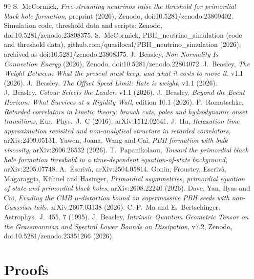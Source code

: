 \documentclass[11pt]{article}
\begin{document}
\begin{thebibliography}{99}
 S.~McCormick, \emph{Free-streaming neutrinos raise the threshold for primordial black hole formation}, preprint (2026), Zenodo, doi:10.5281/zenodo.23809402. Simulation code, threshold data and scripts: Zenodo, doi:10.5281/zenodo.23808375.
 S.~McCormick, PBH\_neutrino\_simulation (code and threshold data), github.com/quasilocal/PBH\_neutrino\_simulation (2026); archived as doi:10.5281/zenodo.23808375.
 J.~Beasley, \emph{Non-Normality Is Connection Energy} (2026), Zenodo, doi:10.5281/zenodo.22804072.
 J.~Beasley, \emph{The Weight Between: What the present must keep, and what it costs to move it}, v1.1 (2026).
 J.~Beasley, \emph{The Offset Speed Limit: Rate is weight}, v1.1 (2026).
 J.~Beasley, \emph{Colour Selects the Leader}, v1.1 (2026).
 J.~Beasley, \emph{Beyond the Event Horizon: What Survives at a Rigidity Wall}, edition 10.1 (2026).
 P.~Romatschke, \emph{Retarded correlators in kinetic theory: branch cuts, poles and hydrodynamic onset transitions}, Eur.\ Phys.\ J.\ C (2016), arXiv:1512.02641.
 J.~Hu, \emph{Relaxation time approximation revisited and non-analytical structure in retarded correlators}, arXiv:2409.05131.
 Yuwen, Joana, Wang and Cai, \emph{PBH formation with bulk viscosity}, arXiv:2606.26532 (2026).
 T.~Papanikolaou, \emph{Toward the primordial black hole formation threshold in a time-dependent equation-of-state background}, arXiv:2205.07748.
 A.~Escriv\`a, arXiv:2504.05814.
 Gonin, Froustey, Escriv\`a, Magaraggia, K\"uhnel and Hasinger, \emph{Primordial asymmetries, primordial equation of state and primordial black holes}, arXiv:2608.22240 (2026).
 Dave, Yan, Ilyas and Cai, \emph{Evading the CMB $\mu$-distortion bound on supermassive PBH seeds with non-Gaussian tails}, arXiv:2607.03138 (2026).
 C.-P.~Ma and E.~Bertschinger, Astrophys.\ J.\ 455, 7 (1995).
 J.~Beasley, \emph{Intrinsic Quantum Geometric Tensor on the Grassmannian and Spectral Lower Bounds on Dissipation}, v7.2, Zenodo, doi:10.5281/zenodo.23351266 (2026).
\end{thebibliography}

\appendix
\section{Proofs}
\end{document}
